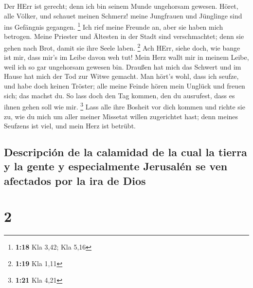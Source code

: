  Der HErr ist gerecht; denn ich bin seinem Munde
ungehorsam gewesen. Höret, alle Völker, und schauet meinen Schmerz!
meine Jungfrauen und Jünglinge sind ins Gefängnis gegangen. \footnote{\textbf{1:18}
  Kla 3,42; Kla 5,16}  Ich rief meine Freunde an, aber
sie haben mich betrogen. Meine Priester und Ältesten in der Stadt sind
verschmachtet; denn sie gehen nach Brot, damit sie ihre Seele laben.
\footnote{\textbf{1:19} Kla 1,11}  Ach HErr, siehe doch,
wie bange ist mir, dass mir's im Leibe davon weh tut! Mein Herz wallt
mir in meinem Leibe, weil ich so gar ungehorsam gewesen bin. Draußen hat
mich das Schwert und im Hause hat mich der Tod zur Witwe gemacht.
 Man hört's wohl, dass ich seufze, und habe doch keinen
Tröster; alle meine Feinde hören mein Unglück und freuen sich; das
machst du. So lass doch den Tag kommen, den du ausrufest, dass es ihnen
gehen soll wie mir. \footnote{\textbf{1:21} Kla 4,21} 
Lass alle ihre Bosheit vor dich kommen und richte sie zu, wie du mich um
aller meiner Missetat willen zugerichtet hast; denn meines Seufzens ist
viel, und mein Herz ist betrübt.

\hypertarget{descripciuxf3n-de-la-calamidad-de-la-cual-la-tierra-y-la-gente-y-especialmente-jerusaluxe9n-se-ven-afectados-por-la-ira-de-dios}{%
\subsection{Descripción de la calamidad de la cual la tierra y la gente
y especialmente Jerusalén se ven afectados por la ira de
Dios}\label{descripciuxf3n-de-la-calamidad-de-la-cual-la-tierra-y-la-gente-y-especialmente-jerusaluxe9n-se-ven-afectados-por-la-ira-de-dios}}

\hypertarget{section-1}{%
\section{2}\label{section-1}}

